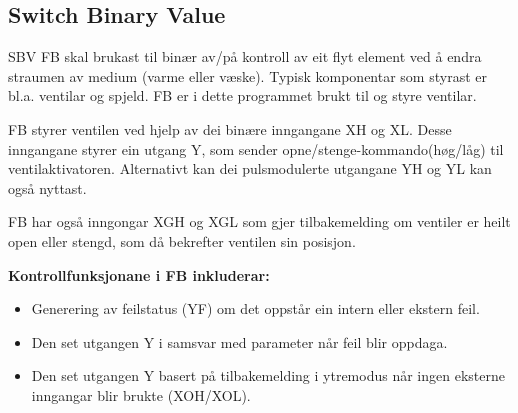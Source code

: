 \newpage

\subsection{Switch Binary Value}

\gls{SBV} \gls{FB} skal brukast til binær av/på kontroll av eit flyt element ved å endra straumen av medium (varme eller væske). 
Typisk komponentar som styrast er bl.a. ventilar og spjeld.
\gls{FB} er i dette programmet brukt til og styre ventilar.

\gls{FB} styrer ventilen ved hjelp av dei binære inngangane XH og XL.
Desse inngangane styrer ein utgang Y, som sender opne/stenge-kommando(høg/låg) til ventilaktivatoren.
Alternativt kan dei pulsmodulerte utgangane YH og YL kan også nyttast.

\gls{FB} har også inngongar XGH og XGL som gjer tilbakemelding om ventiler er heilt open eller stengd,
som då bekrefter ventilen sin posisjon.

\textbf{Kontrollfunksjonane i \gls{FB} inkluderar:}
\begin{itemize}
    \item Generering av feilstatus (YF) om det oppstår ein intern eller ekstern feil.
    \item Den set utgangen Y i samsvar med parameter når feil blir oppdaga.
    \item Den set utgangen Y basert på tilbakemelding i ytremodus når ingen eksterne inngangar blir brukte (XOH/XOL).
\end{itemize}

